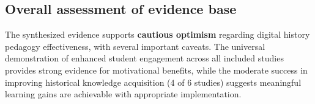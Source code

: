 \documentclass[
hf,
]{ceurart}
\begin{document}



\subsection{Overall assessment of evidence base}

The synthesized evidence supports \textbf{cautious optimism} regarding digital history pedagogy effectiveness, with several important caveats. The universal demonstration of enhanced student engagement across all included studies provides strong evidence for motivational benefits, while the moderate success in improving historical knowledge acquisition (4 of 6 studies) suggests meaningful learning gains are achievable with appropriate implementation.
\end{document}
